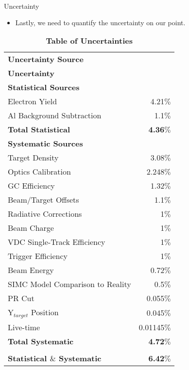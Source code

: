 \documentclass[10pt]{beamer}
\begin{document}
\begin{frame}[fragile]{Uncertainty}

	\begin{itemize}
		\item Lastly, we need to quantify the \alert{uncertainty on our point}.
	\end{itemize}
	
	\vspace{-2mm}
	{\scriptsize{
	\begin{table}[!h]
	\centering
	\begin{tabular}{|l | r |}
	\hline
	\textbf{Uncertainty Source} & \makecell{\textbf{Cross Section}\\ \textbf{Uncertainty}} \\
	\hline
	\textbf{Statistical Sources} &  \\ 
	\hline
	Electron Yield & 4.21$\%$\\
	Al Background Subtraction & 1.1$\%$\\
	\textbf{Total Statistical} &  \setbeamercolor{alerted text}{fg=TolLightRed}\alert{\textbf{4.36$\%$}}\\
	\hline
	\textbf{Systematic Sources} &  \\
	\hline
	Target Density & 3.08$\%$\\
	Optics Calibration & 2.248$\%$\\
	GC Efficiency & 1.32$\%$\\
	Beam/Target Offsets & 1.1$\%$\\
	Radiative Corrections & 1$\%$\\
	Beam Charge & 1$\%$\\
	VDC Single-Track Efficiency & 1$\%$\\
	Trigger Efficiency & 1$\%$\\
	Beam Energy & 0.72$\%$\\
	SIMC Model Comparison to Reality & 0.5$\%$\\
	PR Cut & 0.055$\%$\\ 
	Y$_{target}$ Position & 0.045$\%$\\
	Live-time & 0.01145$\%$\\
	\textbf{Total Systematic} &  \setbeamercolor{alerted text}{fg=TolDarkBlue}\alert{\textbf{4.72$\%$}}\\
	\hline
	\setbeamercolor{alerted text}{fg=mLightBrown}
	\makecell{\textbf{Total Uncertainty}\\ \textbf{Statistical $\&$ Systematic}} &  \alert{\textbf{6.42$\%$}}\\
	\hline
	\end{tabular}
	\caption{{\bf{Table of Uncertainties}} }
	\label{tab:uncertainty}
	\end{table}
	}}

\end{frame}
\end{document}
